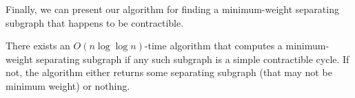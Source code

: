 \documentclass[letterpaper,review]{siamart190516}
\def\snip{\mathbin{\raisebox{0.15ex}{\rotatebox[origin=c]{60}{\Rightscissors}\!}}}
\def\snip{\mathbin{\backslash\!\!\backslash}}
\begin{document}
{


Finally, we can present our algorithm for finding a minimum-weight separating subgraph that happens
to be contractible.
\begin{lemma}
\label{lem:contractible-alg}
There exists an $O(n \log \log n)$-time algorithm that computes a minimum-weight separating subgraph if any such subgraph is a simple contractible cycle. If not, the algorithm either returns some separating subgraph (that may not be minimum weight) or nothing.
\end{lemma}


}
\end{document}
